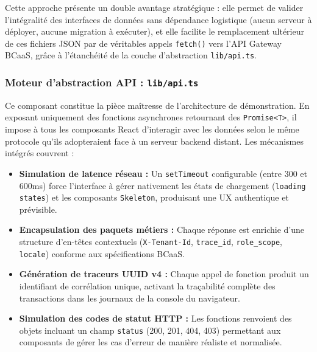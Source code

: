 \documentclass[12pt,a4paper]{report}
\begin{document}
\noindent
Cette approche présente un double avantage stratégique : elle permet de valider l'intégralité des interfaces de données sans dépendance logistique (aucun serveur à déployer, aucune migration à exécuter), et elle facilite le remplacement ultérieur de ces fichiers JSON par de véritables appels \texttt{fetch()} vers l'API Gateway BCaaS, grâce à l'étanchéité de la couche d'abstraction \texttt{lib/api.ts}.

\subsubsection*{Moteur d'abstraction API : \texttt{lib/api.ts}}

\noindent
Ce composant constitue la pièce maîtresse de l'architecture de démonstration. En exposant uniquement des fonctions asynchrones retournant des \texttt{Promise<T>}, il impose à tous les composants React d'interagir avec les données selon le même protocole qu'ils adopteraient face à un serveur backend distant. Les mécanismes intégrés couvrent :

\begin{itemize}[leftmargin=1.5cm, itemsep=5pt]
    \item \textbf{Simulation de latence réseau :} Un \texttt{setTimeout} configurable (entre 300 et 600ms) force l'interface à gérer nativement les états de chargement (\texttt{loading states}) et les composants \texttt{Skeleton}, produisant une UX authentique et prévisible.
    \item \textbf{Encapsulation des paquets métiers :} Chaque réponse est enrichie d'une structure d'en-têtes contextuels (\texttt{X-Tenant-Id}, \texttt{trace\_id}, \texttt{role\_scope}, \texttt{locale}) conforme aux spécifications BCaaS.
    \item \textbf{Génération de traceurs UUID v4 :} Chaque appel de fonction produit un identifiant de corrélation unique, activant la traçabilité complète des transactions dans les journaux de la console du navigateur.
    \item \textbf{Simulation des codes de statut HTTP :} Les fonctions renvoient des objets incluant un champ \texttt{status} (200, 201, 404, 403) permettant aux composants de gérer les cas d'erreur de manière réaliste et normalisée.
\end{itemize}
\end{document}

